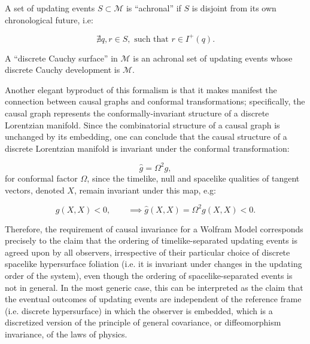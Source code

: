 \documentclass{article}
\begin{document}
\begin{definition}
A set of updating events ${S \subset \mathcal{M}}$ is ``achronal'' if $S$ is disjoint from its own chronological future, i.e:

\begin{equation}
\nexists q, r \in S, \text{ such that } r \in I^{+} \left( q \right).
\end{equation}
\end{definition}

\begin{definition}
A ``discrete Cauchy surface'' in ${\mathcal{M}}$ is an achronal set of updating events whose discrete Cauchy development is ${\mathcal{M}}$.
\end{definition}
Another elegant byproduct of this formalism is that it makes manifest the connection between causal graphs and conformal transformations; specifically, the causal graph represents the conformally-invariant structure of a discrete Lorentzian manifold. Since the combinatorial structure of a causal graph is unchanged by its embedding, one can conclude that the causal structure of a discrete Lorentzian manifold is invariant under the conformal transformation:

\begin{equation}
\hat{g} = \Omega^2 g,
\end{equation}
for conformal factor ${\Omega}$, since the timelike, null and spacelike qualities of tangent vectors, denoted ${X}$, remain invariant under this map, e.g:

\begin{equation}
g \left( X, X \right) < 0, \qquad \implies \hat{g} \left( X, X \right) = \Omega^2 g \left( X, X \right) < 0.
\end{equation}

Therefore, the requirement of causal invariance for a Wolfram Model corresponds precisely to the claim that the ordering of timelike-separated updating events is agreed upon by all observers, irrespective of their particular choice of discrete spacelike hypersurface foliation (i.e. it is invariant under changes in the updating order of the system), even though the ordering of spacelike-separated events is not in general. In the most generic case, this can be interpreted as the claim that the eventual outcomes of updating events are independent of the reference frame (i.e. discrete hypersurface) in which the observer is embedded, which is a discretized version of the principle of general covariance, or diffeomorphism invariance, of the laws of physics.
\end{document}
